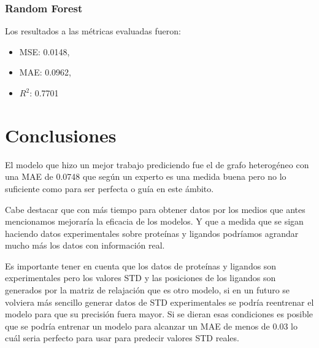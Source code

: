 \documentclass{article}
\begin{document}
\subsubsection{Random Forest}
Los resultados a las métricas evaluadas fueron:
\begin{itemize}
    \item MSE: 0.0148,
    \item MAE: 0.0962,
    \item \(R^2\): 0.7701
\end{itemize}

\newpage

\section{Conclusiones}

El modelo que hizo un mejor trabajo prediciendo fue el de grafo heterogéneo con una MAE de 0.0748 que según un experto es una medida buena pero no lo suficiente como para ser perfecta o guía en este ámbito.

Cabe destacar que con más tiempo para obtener datos por los medios que antes mencionamos mejoraría la eficacia de los modelos. Y que a medida que se sigan haciendo datos experimentales sobre proteínas
y ligandos podríamos agrandar mucho más los datos con información real.

Es importante tener en cuenta que los datos de proteínas y ligandos son experimentales pero los valores STD y las posiciones de los ligandos son generados por la matriz de relajación que es otro modelo,
si en un futuro se volviera más sencillo generar datos de STD experimentales se podría reentrenar el modelo para que su precisión fuera mayor. Si se dieran esas condiciones es posible que se podría entrenar
un modelo para alcanzar un MAE de menos de 0.03 lo cuál seria perfecto para usar para predecir valores STD reales.

\newpage



\end{document}
